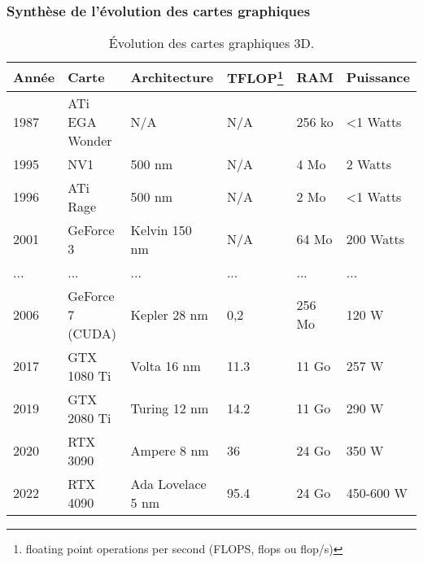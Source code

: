 \begin{frame}
  \frametitle{Synthèse de l'évolution des cartes graphiques}
\begin{table}
\scriptsize  \centering
            \hspace*{-0.5 cm}\begin{tabular}{llllll}
            \rowcolor{lightgray}\textbf{Année} & \textbf{Carte} & \textbf{Architecture} & \textbf{TFLOP\footnote{\tiny floating point operations per second (FLOPS, flops ou flop/s) }} & \textbf{RAM} & \textbf{Puissance} \\\hline
            1987 & ATi EGA Wonder & N/A & N/A & 256 ko & <1 Watts \\
            1995 & NV1 & 500 nm & N/A & 4 Mo & 2 Watts \\
            1996 & ATi Rage & 500 nm & N/A & 2 Mo & <1 Watts \\
            2001 & GeForce 3 & Kelvin 150 nm & N/A  & 64 Mo & 200 Watts \\
            
            ... & ... & ...  & ... & ... & ...\\
            2006 & GeForce 7 (CUDA) & Kepler 28 nm & 0,2 & 256 Mo & 120 W\\
            2017 & GTX 1080 Ti & Volta 16 nm & 11.3 & 11 Go & 257 W \\
            2019 & GTX 2080 Ti & Turing 12 nm & 14.2 & 11 Go & 290 W \\
            2020 & RTX 3090 & Ampere 8 nm & 36 & 24 Go & 350 W \\

            2022 & RTX 4090 & Ada Lovelace 5 nm & 95.4 & 24 Go & 450-600 W \\ 
            \end{tabular}
          \caption{Évolution des cartes graphiques 3D.}\label{tab:evo_cartes3D}
          \end{table}
\end{frame}
